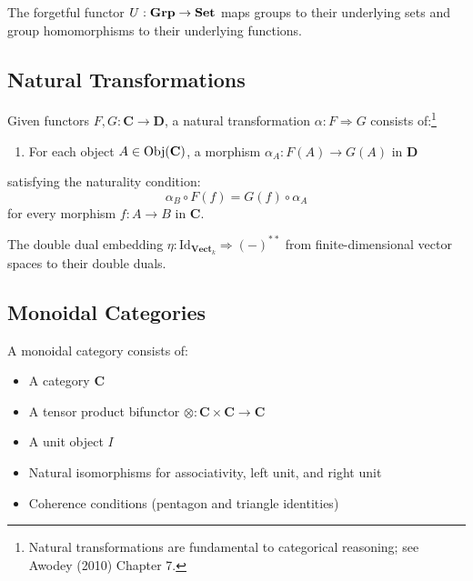 \begin{example}
The forgetful functor $U: \mathbf{Grp} \to \mathbf{Set}$ maps groups to their underlying sets and group homomorphisms to their underlying functions.
\end{example}

\subsection{Natural Transformations}

\begin{definition}
Given functors $F, G: \mathbf{C} \to \mathbf{D}$, a natural transformation $\alpha: F \Rightarrow G$ consists of:\footnote{Natural transformations are fundamental to categorical reasoning; see Awodey (2010) Chapter 7.}
\begin{enumerate}
\item For each object $A \in \mathrm{Obj}(\mathbf{C})$, a morphism $\alpha_A: F(A) \to G(A)$ in $\mathbf{D}$
\end{enumerate}
satisfying the naturality condition:
\begin{equation}
\alpha_B \circ F(f) = G(f) \circ \alpha_A
\end{equation}
for every morphism $f: A \to B$ in $\mathbf{C}$.
\end{definition}

\begin{example}
The double dual embedding $\eta: \mathrm{Id}_{\mathbf{Vect}_k} \Rightarrow (-)^{**}$ from finite-dimensional vector spaces to their double duals.
\end{example}

\subsection{Monoidal Categories}

\begin{definition}
A monoidal category consists of:
\begin{itemize}
\item A category $\mathbf{C}$
\item A tensor product bifunctor $\otimes: \mathbf{C} \times \mathbf{C} \to \mathbf{C}$
\item A unit object $I$
\item Natural isomorphisms for associativity, left unit, and right unit
\item Coherence conditions (pentagon and triangle identities)
\end{itemize}
\end{definition}

